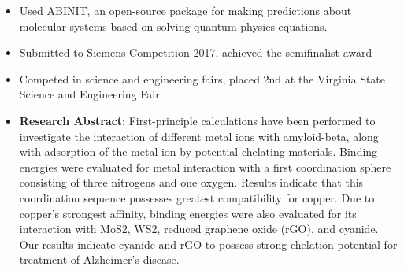 \documentclass[letterpaper,11pt]{article}
\newcommand{\resitem}[1]{\item #1 \vspace{-2pt}}
\begin{document}
\begin{itemize}
\begin{itemize}
		\resitem{Used ABINIT, an open-source package for making predictions about molecular systems based on solving quantum physics equations.}
		\resitem{Submitted to Siemens Competition 2017, achieved the semifinalist award}
		\resitem{Competed in science and engineering fairs, placed 2nd at the Virginia State Science and Engineering Fair}
		\resitem{\textbf{Research Abstract}: \scriptsize{First-principle calculations have been performed to investigate the interaction of different metal ions with amyloid-beta, along with adsorption of the metal ion by potential chelating materials. Binding energies were evaluated for metal interaction with a first coordination sphere consisting of three nitrogens and one oxygen. Results indicate that this coordination sequence possesses greatest compatibility for copper. Due to copper's strongest affinity, binding energies were also evaluated for its interaction with MoS2, WS2, reduced graphene oxide (rGO), and cyanide. Our results indicate cyanide and rGO to possess strong chelation potential for treatment of Alzheimer's disease.}}
	\end{itemize}
	
\end{itemize}
\end{document}
